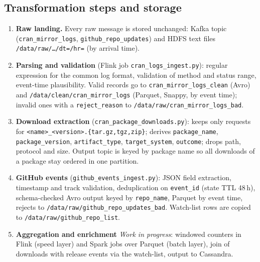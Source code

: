 \documentclass[11pt,a4paper]{article}
\newcommand{\planned}{\textit{Work in progress}}
\begin{document}
\subsection{Transformation steps and storage}

\begin{enumerate}
  \item \textbf{Raw landing.} Every raw message is stored unchanged: Kafka topic (\texttt{cran\_\allowbreak{}mirror\_\allowbreak{}logs},
        \texttt{github\_\allowbreak{}repo\_\allowbreak{}updates}) and HDFS text files \texttt{/data/raw/\ldots/dt=/hr=} (by arrival time).
  \item \textbf{Parsing and validation} (Flink job \texttt{cran\_\allowbreak{}logs\_\allowbreak{}ingest.py}): regular expression for the common log
        format, validation of method and status range, event-time plausibility. Valid records go to
        \texttt{cran\_\allowbreak{}mirror\_\allowbreak{}logs\_\allowbreak{}clean} (Avro) and \texttt{/data/clean/cran\_\allowbreak{}mirror\_\allowbreak{}logs} (Parquet, Snappy, by event time); invalid
        ones with a \texttt{reject\_\allowbreak{}reason} to \texttt{/data/raw/cran\_\allowbreak{}mirror\_\allowbreak{}logs\_\allowbreak{}bad}.
  \item \textbf{Download extraction} (\texttt{cran\_\allowbreak{}package\_\allowbreak{}downloads.py}): keeps only requests for
        \texttt{<name>\_\allowbreak{}<version>.\{tar.gz,tgz,zip\}}; derives \texttt{package\_\allowbreak{}name}, \texttt{package\_\allowbreak{}version},
        \texttt{artifact\_\allowbreak{}type}, \texttt{target\_\allowbreak{}system}, \texttt{outcome}; drops path, protocol and size. Output topic is keyed by package name
        so all downloads of a package stay ordered in one partition.
  \item \textbf{GitHub events} (\texttt{github\_\allowbreak{}events\_\allowbreak{}ingest.py}): JSON field extraction, timestamp and track validation,
        deduplication on \texttt{event\_\allowbreak{}id} (state TTL 48\,h), schema-checked Avro output keyed by \texttt{repo\_\allowbreak{}name}, Parquet by event time,
        rejects to \texttt{/data/raw/github\_\allowbreak{}repo\_\allowbreak{}updates\_\allowbreak{}bad}. Watch-list rows are copied to \texttt{/data/raw/github\_\allowbreak{}repo\_\allowbreak{}list}.
  \item \textbf{Aggregation and enrichment} \planned: windowed counters in Flink (speed layer) and Spark jobs over Parquet
        (batch layer), join of downloads with release events via the watch-list, output to Cassandra.
\end{enumerate}
\end{document}

